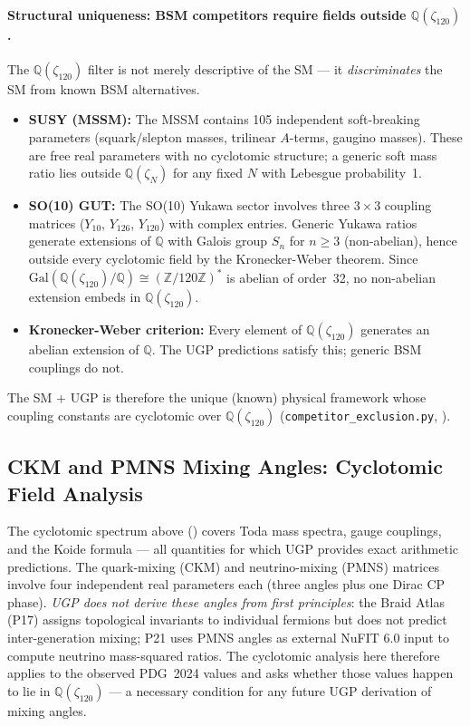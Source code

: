 \documentclass[11pt]{article}
\theoremstyle{remark}
\newcommand{\zetaN}[1]{\zeta_{#1}}
\begin{document}
\paragraph{Structural uniqueness: BSM competitors require fields outside $\mathbb{Q}(\zetaN{120})$.}
The $\mathbb{Q}(\zetaN{120})$ filter is not merely descriptive of the SM --- it
\emph{discriminates} the SM from known BSM alternatives.
\begin{itemize}
\item \textbf{SUSY (MSSM):} The MSSM contains 105 independent soft-breaking
  parameters (squark/slepton masses, trilinear $A$-terms, gaugino masses).
  These are free real parameters with no cyclotomic structure; a generic soft mass ratio
  lies outside $\mathbb{Q}(\zetaN{N})$ for any fixed $N$ with Lebesgue probability~1.

\item \textbf{SO(10) GUT:} The SO(10) Yukawa sector involves three $3\times3$ coupling
  matrices ($Y_{10}$, $Y_{126}$, $Y_{120}$) with complex entries.  Generic Yukawa ratios
  generate extensions of $\mathbb{Q}$ with Galois group $S_n$ for $n \geq 3$ (non-abelian),
  hence outside every cyclotomic field by the Kronecker-Weber theorem.
  Since $\mathrm{Gal}(\mathbb{Q}(\zetaN{120})/\mathbb{Q}) \cong (\mathbb{Z}/120\mathbb{Z})^*$
  is abelian of order~32, no non-abelian extension embeds in $\mathbb{Q}(\zetaN{120})$.

\item \textbf{Kronecker-Weber criterion:}  Every element of $\mathbb{Q}(\zetaN{120})$
  generates an abelian extension of $\mathbb{Q}$.  The UGP predictions satisfy this;
  generic BSM couplings do not.
\end{itemize}
The SM $+$ UGP is therefore the unique (known) physical framework whose coupling
constants are cyclotomic over $\mathbb{Q}(\zetaN{120})$
(\texttt{competitor\_exclusion.py}, \cite{ugp-physics-repo}).

\subsection{CKM and PMNS Mixing Angles: Cyclotomic Field Analysis}
\label{sec:ckm_pmns_cyclotomic}

The cyclotomic spectrum above () covers
Toda mass spectra, gauge couplings, and the Koide formula --- all
quantities for which UGP provides exact arithmetic predictions.
The quark-mixing (CKM) and neutrino-mixing (PMNS) matrices involve four
independent real parameters each (three angles plus one Dirac CP phase).
\emph{UGP does not derive these angles from first principles}: the Braid
Atlas (P17) assigns topological invariants to individual fermions but does
not predict inter-generation mixing; P21 uses PMNS angles as external
NuFIT 6.0 input to compute neutrino mass-squared ratios.  The cyclotomic
analysis here therefore applies to the observed PDG~2024 values and asks
whether those values happen to lie in $\mathbb{Q}(\zeta_{120})$ ---
a necessary condition for any future UGP derivation of mixing angles.
\end{document}
